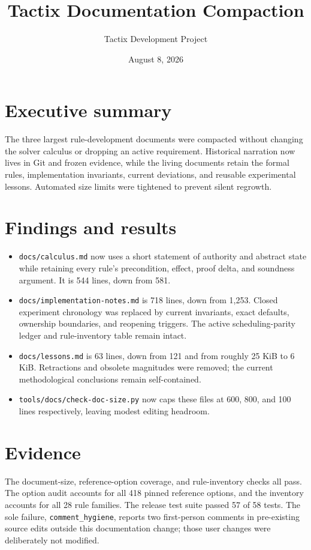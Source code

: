 \documentclass[11pt]{article}
\title{Tactix Documentation Compaction}
\author{Tactix Development Project}
\date{August 8, 2026}
\begin{document}
\maketitle

\section*{Executive summary}
The three largest rule-development documents were compacted without changing the
solver calculus or dropping an active requirement. Historical narration now lives
in Git and frozen evidence, while the living documents retain the formal rules,
implementation invariants, current deviations, and reusable experimental lessons.
Automated size limits were tightened to prevent silent regrowth.

\section{Findings and results}
\begin{itemize}
  \item \texttt{docs/calculus.md} now uses a short statement of authority and
  abstract state while retaining every rule's precondition, effect, proof delta,
  and soundness argument. It is 544 lines, down from 581.
  \item \texttt{docs/implementation-notes.md} is 718 lines, down from 1,253.
  Closed experiment chronology was replaced by current invariants, exact defaults,
  ownership boundaries, and reopening triggers. The active scheduling-parity ledger
  and rule-inventory table remain intact.
  \item \texttt{docs/lessons.md} is 63 lines, down from 121 and from roughly
  25 KiB to 6 KiB. Retractions and obsolete magnitudes were removed; the current
  methodological conclusions remain self-contained.
  \item \texttt{tools/docs/check-doc-size.py} now caps these files at 600, 800,
  and 100 lines respectively, leaving modest editing headroom.
\end{itemize}

\section{Evidence}
The document-size, reference-option coverage, and rule-inventory checks all pass.
The option audit accounts for all 418 pinned reference options, and the inventory
accounts for all 28 rule families. The release test suite passed 57 of 58 tests.
The sole failure, \texttt{comment\_hygiene}, reports two first-person comments in
pre-existing source edits outside this documentation change; those user changes
were deliberately not modified.
\end{document}
